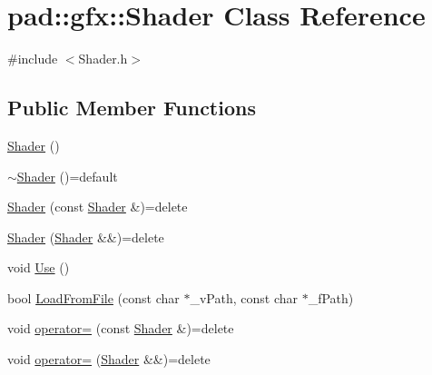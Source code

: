 \hypertarget{classpad_1_1gfx_1_1_shader}{}\section{pad\+:\+:gfx\+:\+:Shader Class Reference}
\label{classpad_1_1gfx_1_1_shader}


{\ttfamily \#include $<$Shader.\+h$>$}

\subsection*{Public Member Functions}
\begin{DoxyCompactItemize}
\item 
\mbox{\hyperlink{classpad_1_1gfx_1_1_shader_a4586e58e09b934d75f84008cf54cd2d7}{Shader}} ()
\item 
\mbox{\hyperlink{classpad_1_1gfx_1_1_shader_ac920a092249199c7d3d4c44d60aeb3d0}{$\sim$\+Shader}} ()=default
\item 
\mbox{\hyperlink{classpad_1_1gfx_1_1_shader_a1d86c13c0a18fb940f8e30870422f51c}{Shader}} (const \mbox{\hyperlink{classpad_1_1gfx_1_1_shader}{Shader}} \&)=delete
\item 
\mbox{\hyperlink{classpad_1_1gfx_1_1_shader_aeb647f99ec9239504b648be1434be6a3}{Shader}} (\mbox{\hyperlink{classpad_1_1gfx_1_1_shader}{Shader}} \&\&)=delete
\item 
void \mbox{\hyperlink{classpad_1_1gfx_1_1_shader_a92b1501375147c0763a50c3b60c6819b}{Use}} ()
\item 
bool \mbox{\hyperlink{classpad_1_1gfx_1_1_shader_af1232aebd7859cd712cd5dbc08c05f32}{Load\+From\+File}} (const char $\ast$\+\_\+v\+Path, const char $\ast$\+\_\+f\+Path)
\item 
void \mbox{\hyperlink{classpad_1_1gfx_1_1_shader_a2166cedcae52902649e267c1927d0272}{operator=}} (const \mbox{\hyperlink{classpad_1_1gfx_1_1_shader}{Shader}} \&)=delete
\item 
void \mbox{\hyperlink{classpad_1_1gfx_1_1_shader_a7b32b62ff74e9081d01f806b22c2f014}{operator=}} (\mbox{\hyperlink{classpad_1_1gfx_1_1_shader}{Shader}} \&\&)=delete
\end{DoxyCompactItemize}
